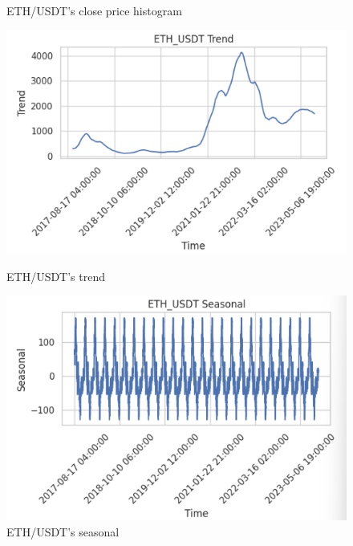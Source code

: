 \documentclass{ieeeojies}
\begin{document}
\begin{figure}[H]
\begin{minipage}{0.23\textwidth}
    \caption{ETH/USDT's close price histogram}
    \label{fig:enter-label}
    \end{minipage}
    \hfill
    \begin{minipage}{0.23\textwidth}
    \centering
    \includegraphics[width=1\textwidth]{bibliography/ETH_trend.png}
    \caption{ETH/USDT's trend}
    \label{fig:enter-label}
    \end{minipage}
    \hfill
    \begin{minipage}{0.23\textwidth}
    \centering
    \includegraphics[width=1\textwidth]{bibliography/ETH_seasonal.png}
    \caption{ETH/USDT's seasonal}
    \label{fig:enter-label}
    \end{minipage}
\end{figure}
\end{document}
